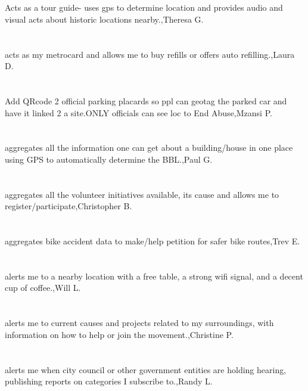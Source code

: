 \section{}Acts as a tour guide- uses gps to determine location and provides audio and visual acts about historic locations nearby.,Theresa G.
\section{}acts as my metrocard and allows me to buy refills or offers auto refilling.,Laura D.
\section{}Add QRcode 2 official parking placards so ppl can geotag the parked car and have it linked 2 a site.ONLY  officials can see loc to End Abuse,Mzansi P.
\section{}aggregates all the information one can get about a building/house in one place using GPS to automatically determine the BBL.,Paul G.
\section{}aggregates all the volunteer initiatives available, its cause and allows me to register/participate,Christopher B.
\section{}aggregates bike accident data to make/help petition for safer bike routes,Trev E.
\section{} alerts me to a nearby location with a free table, a strong wifi signal, and a decent cup of coffee.,Will L.
\section{} alerts me to current causes and projects related to my surroundings, with information on how to help or join the movement.,Christine P.
\section{} alerts me when city council or other government entities are holding hearing, publishing reports on categories I subscribe to.,Randy L.

